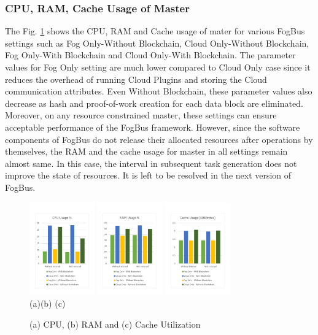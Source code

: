 \documentclass[final,5p,times,twocolumn]{elsarticle}
\begin{document}
\subsubsection{CPU, RAM, Cache Usage of Master}
%
The Fig. \ref{fig:crc} shows the CPU, RAM and Cache usage of mater for various FogBus settings such as Fog Only-Without Blockchain, Cloud Only-Without Blockchain, Fog Only-With Blockchain and Cloud Only-With Blockchain. The parameter values for Fog Only setting are much lower compared to Cloud Only case since it reduces the overhead of running Cloud Plugins and storing the Cloud communication attributes. Even Without Blockchain, these parameter values also decrease as hash and proof-of-work creation for each data block are eliminated. Moreover, on any resource constrained master, these settings can ensure acceptable performance of the FogBus framework. However, since the software components of FogBus do not release their allocated resources after operations by themselves, the RAM and the cache usage for master in all settings remain almost same. In this case, the interval in subsequent task generation does not improve the state of resources. It is left to be resolved in the next version of FogBus.        
%
%
\begin{figure}[h]
	\begin{center}
		\includegraphics[width=28mm, height=40mm]{CPU}
		\hspace{1pt}
		\includegraphics[width=28mm, height=40mm]{RAM}
		\hspace{1pt}
		\includegraphics[width=28mm, height=40mm]{CACHE}\\
        \footnotesize{(a)\hspace{60pt}(b) \hspace{60pt}(c)}\\		 
   	\caption{(a) CPU, (b) RAM and (c) Cache Utilization} \label{fig:crc}
	\end{center}
\end{figure}
%
\end{document}
